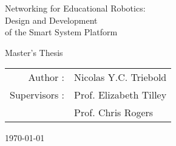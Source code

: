 \newpage%
\clearpage%

\begin{titlepage}%



\begin{center}

%




\vspace*{5cm}%
{\Huge Networking for Educational Robotics:\\ Design and Development \\ of the Smart System Platform\par}

\vspace{2.5cm}%
{\LARGE Master's Thesis}
\vspace{2.5cm}%
        
{\large\begin{tabular}{rl}
    Author : & Nicolas Y.C. Triebold \\
    Supervisors :   & Prof. Elizabeth Tilley \\
                    & Prof. Chris Rogers \\
    \end{tabular}}%
\vfill%
\today%
\end{center}%
\end{titlepage}%